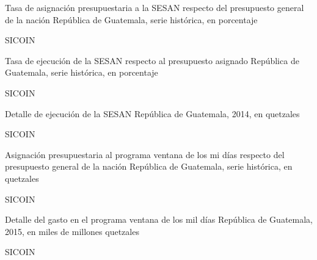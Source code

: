 
{%
 }%
{%
 Tasa de asignación presupuestaria a la SESAN respecto del presupuesto general de la nación } %
{%
 República de Guatemala, serie histórica, en porcentaje} %
{%
 \begin{tikzpicture}[x=1pt,y=1pt]    \end{tikzpicture}}%
{%
 SICOIN} %


 {%
 }%
 {%
 	Tasa de ejecución de la SESAN respecto al presupuesto asignado } %
 {%
 	República de Guatemala, serie histórica, en porcentaje} %
 {%
 	\begin{tikzpicture}[x=1pt,y=1pt]    \end{tikzpicture}}%
 {%
 	SICOIN} %
 
 
  {%
  }%
  {%
  	Detalle de ejecución de la SESAN } %
  {%
  	República de Guatemala, 2014, en quetzales} %
  {%
  	\begin{tikzpicture}[x=1pt,y=1pt]    \end{tikzpicture}}%
  {%
  	SICOIN} %
  
  
  
  {%
  }%
  {%
  Asignación presupuestaria al programa ventana de los mi días respecto del presupuesto general de la nación } %
  {%
  	República de Guatemala, serie histórica, en quetzales} %
  {%
  	\begin{tikzpicture}[x=1pt,y=1pt]    \end{tikzpicture}}%
  {%
  	SICOIN} %
  
  
    {%
    }%
    {%
    	Detalle del gasto en el programa ventana de los mil días} %
    {%
    	República de Guatemala, 2015, en miles de millones quetzales} %
    {%
    	\begin{tikzpicture}[x=1pt,y=1pt]    \end{tikzpicture}}%
    {%
    	SICOIN} %
  